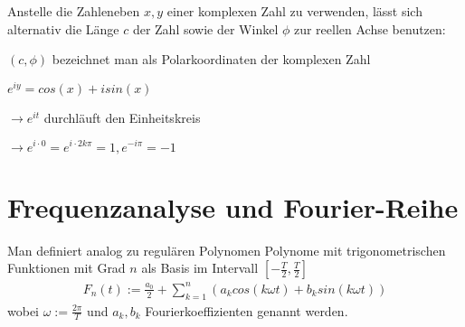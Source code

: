 \begin{definition}[Polardarstellung]
	Anstelle die Zahleneben $x,y$ einer komplexen Zahl zu verwenden, lässt sich alternativ die Länge $c$ der Zahl sowie der Winkel $\phi$ zur reellen Achse benutzen:
	
	
	$(c, \phi) $ bezeichnet man als Polarkoordinaten der komplexen Zahl
	
\end{definition}

\begin{satz}
	$e^{iy} = cos(x) + i sin(x)$
	
	\begin{description}[noitemsep]
		\item $\rightarrow e^{it}$ durchläuft den Einheitskreis 
		\item $\rightarrow e^{i \cdot 0} = e^{i \cdot 2k\pi} = 1, e^{-i\pi} = -1$
	\end{description}
	
\end{satz}

\pagebreak

\section{Frequenzanalyse und Fourier-Reihe}
\begin{definition}
	Man definiert analog zu regulären Polynomen Polynome mit trigonometrischen Funktionen mit Grad $n$ als Basis im Intervall $[-\frac{T}{2}, \frac{T}{2}]$ 
	\begin{align*}
		F_n(t) := \frac{a_0}{2} + \sum_{k=1}^{n} (a_k cos(k\omega t) + b_k sin(k \omega t))
	\end{align*}
	wobei $\omega := \frac{2 \pi}{T}$ und $a_k, b_k$ Fourierkoeffizienten genannt werden.
\end{definition}

